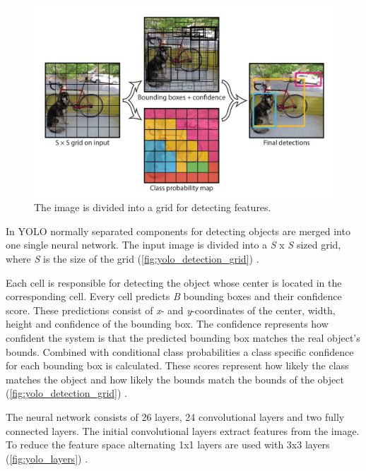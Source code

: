\begin{figure}[!ht]
\centering
\includegraphics[width=\linewidth]{images/basics/yolo_detection_grid}
\caption{The image is divided into a grid for detecting features. \autocite{yolo}}
\label{fig:yolo_detection_grid}
\end{figure}

In \ac{YOLO} normally separated components for detecting objects are merged into one single neural network. The input image is divided into a \textit{S} x \textit{S} sized grid, where \textit{S} is the size of the grid (\autoref{fig:yolo_detection_grid}) \autocite{yolo}.

Each cell is responsible for detecting the object whose center is located in the corresponding cell. Every cell predicts \textit{B} bounding boxes and their confidence score. These predictions consist of \textit{x}- and \textit{y}-coordinates of the center, width, height and confidence of the bounding box. The confidence represents how confident the system is that the predicted bounding box matches the real object's bounds. Combined with conditional class probabilities a class specific confidence for each bounding box is calculated. These scores represent how likely the class matches the object and how likely the bounds match the bounds of the object (\autoref{fig:yolo_detection_grid}) \autocite{yolo}.

The neural network consists of 26 layers, 24 convolutional layers and two fully connected layers. The initial convolutional layers extract features from the image. To reduce the feature space alternating 1x1 layers are used with 3x3 layers (\autoref{fig:yolo_layers}) \autocite{yolo}.

